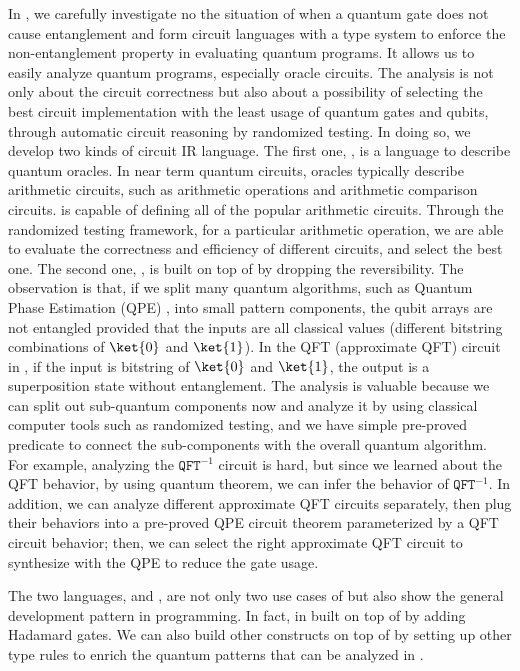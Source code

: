 {In \name, we carefully investigate no the situation of when a quantum gate does not cause entanglement and form circuit languages with a type system to enforce the non-entanglement property in evaluating quantum programs. It allows us to easily analyze quantum programs, especially oracle circuits. The analysis is not only about the circuit correctness but also about a possibility of selecting the best circuit implementation with the least usage of quantum gates and qubits, through automatic circuit reasoning by randomized testing.
In doing so, we develop two kinds of circuit IR language. The first one, \oqasm, is a language to describe quantum oracles. In near term quantum circuits, oracles typically describe arithmetic circuits, such as arithmetic operations and arithmetic comparison circuits.
\oqasm is capable of defining all of the popular arithmetic circuits. Through the randomized testing framework, for a particular arithmetic operation, we are able to evaluate the correctness and efficiency of different circuits, and select the best one.
The second one, \pqasm, is built on top of \oqasm by dropping the reversibility. The observation is that, if we split many quantum algorithms, such as Quantum Phase Estimation (QPE) \cite{kitaev1995quantum}, into small pattern components, the qubit arrays are not entangled provided that the inputs are all classical values (different bitstring combinations of $\ket{0}$ and $\ket{1}$). 
In the QFT (approximate QFT) circuit in , if the input is bitstring of $\ket{0}$ and $\ket{1}$, the output is a superposition state without entanglement. The analysis is valuable because we can split out sub-quantum components now and analyze it by using classical computer tools such as randomized testing, and we have simple pre-proved predicate to connect the sub-components with the overall quantum algorithm. For example, analyzing the $\texttt{QFT}^{-1}$ circuit is hard, but since we learned about the QFT behavior, by using quantum theorem, we can infer the behavior of $\texttt{QFT}^{-1}$. In addition, we can analyze different approximate QFT circuits separately, then plug their behaviors into a pre-proved QPE circuit theorem parameterized by a QFT circuit behavior; then, we can select the right approximate QFT circuit to synthesize with the QPE to reduce the gate usage.

The two languages, \oqasm and \pqasm, are not only two use cases of \name but also show the general development pattern in \name programming. In fact, \pqasm in built on top of \oqasm by adding Hadamard gates. We can also build other constructs on top of \oqasm by setting up other type rules to enrich the quantum patterns that can be analyzed in \name.
}
